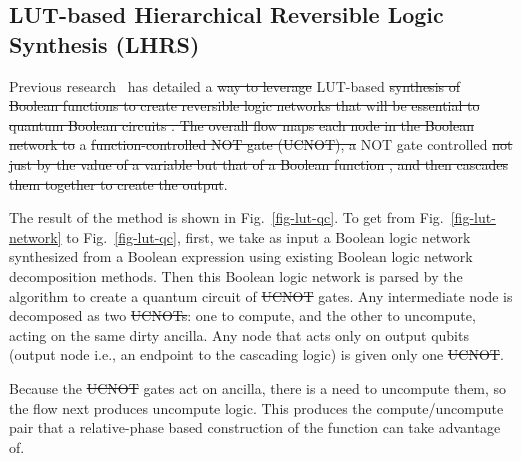 \documentclass[paper]{ieice}
\providecommand{\DIFadd}[1]{{\protect\color{blue}{#1}}} %
\providecommand{\DIFdel}[1]{{\protect\color{red}\sout{#1}}}                      %
\providecommand{\DIFaddbegin}{} %
\providecommand{\DIFaddend}{} %
\providecommand{\DIFdelbegin}{} %
\providecommand{\DIFdelend}{} %
\newcommand{\DIFscaledelfig}{0.5}
\newlength{\DIFdelgraphicswidth} %
\newlength{\DIFdelgraphicsheight} %
\newcommand{\DIFaddincludegraphics}[2][]{{\color{blue}\fbox{\DIFOincludegraphics[#1]{#2}}}} %
\newcommand{\DIFdelincludegraphics}[2][]{%
\sbox{\DIFdelgraphicsbox}{\DIFOincludegraphics[#1]{#2}}%
\settoboxwidth{\DIFdelgraphicswidth}{\DIFdelgraphicsbox} %
\settoboxtotalheight{\DIFdelgraphicsheight}{\DIFdelgraphicsbox} %
\scalebox{\DIFscaledelfig}{%
\parbox[b]{\DIFdelgraphicswidth}{\usebox{\DIFdelgraphicsbox}\\[-\baselineskip] \rule{\DIFdelgraphicswidth}{0em}}\llap{\resizebox{\DIFdelgraphicswidth}{\DIFdelgraphicsheight}{%
\setlength{\unitlength}{\DIFdelgraphicswidth}%
\begin{picture}(1,1)%
\thicklines\linethickness{2pt} %
{\color[rgb]{1,0,0}\put(0,0){\framebox(1,1){}}}%
{\color[rgb]{1,0,0}\put(0,0){\line( 1,1){1}}}%
{\color[rgb]{1,0,0}\put(0,1){\line(1,-1){1}}}%
\end{picture}%
}\hspace*{3pt}}} %
} %
\DeclareRobustCommand{\DIFaddbegin}{\DIFOaddbegin \let\includegraphics\DIFaddincludegraphics} %
\DeclareRobustCommand{\DIFaddend}{\DIFOaddend \let\includegraphics\DIFOincludegraphics} %
\DeclareRobustCommand{\DIFdelbegin}{\DIFOdelbegin \let\includegraphics\DIFdelincludegraphics} %
\DeclareRobustCommand{\DIFdelend}{\DIFOaddend \let\includegraphics\DIFOincludegraphics} %
\begin{document}
{\subsection{LUT-based Hierarchical Reversible Logic Synthesis (LHRS)}
\label{Subsec:lhrs}

Previous research~\cite{bib-lhrs-soeken} has detailed a \DIFdelbegin \DIFdel{way to leverage }\DIFdelend \DIFaddbegin \DIFadd{method to use Boolean Logic
Networks to generate quantum circuits in a manner similar classical }\DIFaddend LUT-based \DIFdelbegin \DIFdel{synthesis of Boolean functions to create reversible logic networks that will be essential to quantum Boolean circuits . The overall flow maps each node in the Boolean network to }\DIFdelend \DIFaddbegin \DIFadd{logic 
synthesis. In this paradigm, each of the nodes is interpreted as a lookup table, 
where the inputs are interpreted as indices, and the outputs are entries, according 
to its truth table. As a quantum circuit, they are implemented as }\DIFaddend a \DIFdelbegin \DIFdel{function-controlled NOT gate (UCNOT), a }\DIFdelend NOT gate controlled
\DIFdelbegin \DIFdel{not just by the value of a variable but that of a Boolean function , and then cascades them together to create the output}\DIFdelend \DIFaddbegin \DIFadd{by an arbitrary function (FCNOT)}\DIFaddend .

The result of the method is shown in Fig.~\ref{fig-lut-qc}. To get from Fig.~\ref{fig-lut-network} to Fig.~\ref{fig-lut-qc}, first, we take as input a Boolean logic network synthesized from a Boolean expression using existing Boolean logic network decomposition methods. Then this Boolean logic network is parsed by the algorithm to create a quantum circuit of \DIFdelbegin \DIFdel{UCNOT }\DIFdelend \DIFaddbegin \DIFadd{FCNOT }\DIFaddend gates. Any intermediate node is decomposed as two \DIFdelbegin \DIFdel{UCNOTs}\DIFdelend \DIFaddbegin \DIFadd{FCNOTs}\DIFaddend : one to compute, and the other to uncompute, acting on the same dirty ancilla. Any node that acts only on output qubits (output node i.e., an endpoint to the cascading logic) is given only one \DIFdelbegin \DIFdel{UCNOT}\DIFdelend \DIFaddbegin \DIFadd{FCNOT}\DIFaddend .


Because the \DIFdelbegin \DIFdel{UCNOT }\DIFdelend \DIFaddbegin \DIFadd{FCNOT }\DIFaddend gates act on ancilla, there is a need to uncompute them, so the flow next produces uncompute logic. This produces the compute/uncompute pair that a relative-phase based construction of the function can take advantage of. 

}
\end{document}

